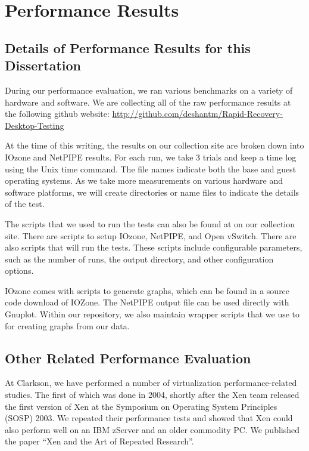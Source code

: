 

\chapter{Performance Results}

\section{Details of Performance Results for this Dissertation}

During our performance evaluation, we ran various benchmarks on a variety of hardware and software. We are collecting all of the raw performance results at the following github website: \url{http://github.com/deshantm/Rapid-Recovery-Desktop-Testing}

At the time of this writing, the results on our collection site are broken down into IOzone and NetPIPE results. For each run, we take 3 trials and keep a time log using the Unix time command. The file names indicate both the base and guest operating systems. As we take more measurements on various hardware and software platforms, we will create directories or name files to indicate the details of the test.

The scripts that we used to run the tests can also be found at on our collection site. There are scripts to setup IOzone, NetPIPE, and Open vSwitch. There are also scripts that will run the tests. These scripts include configurable parameters, such as the number of runs, the output directory, and other configuration options. 

IOzone comes with scripts to generate graphs, which can be found in a source code download of IOZone. The NetPIPE output file can be used directly with Gnuplot. Within our repository, we also maintain wrapper scripts that we use to for creating graphs from our data.

\section{Other Related Performance Evaluation}

At Clarkson, we have performed a number of virtualization performance-related studies. The first of which was done in 2004, shortly after the Xen team released the first version of Xen at the Symposium on Operating System Principles (SOSP) 2003. We repeated their performance tests and showed that Xen could also perform well on an IBM zServer and an older commodity PC. We published the paper ``Xen and the Art of Repeated Research''\cite{clark_2004}.

